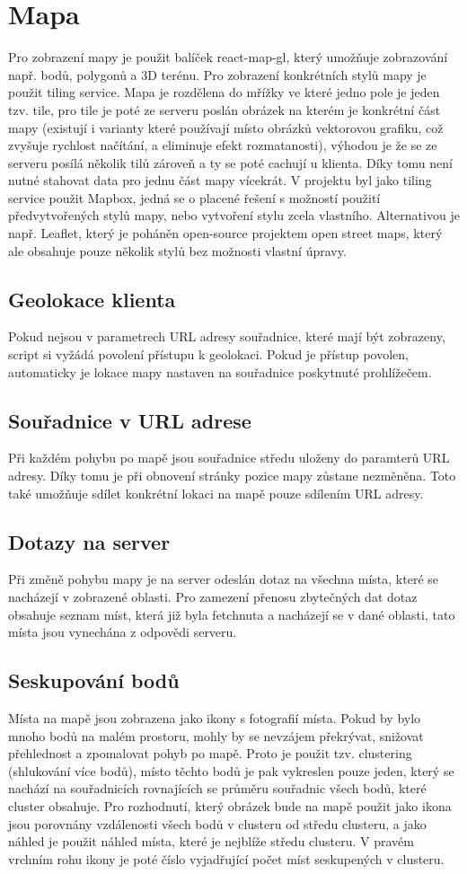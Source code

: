 \documentclass[12pt, a4paper,
 twoside,        %
 openright
]{report}
\begin{document}
\section{Mapa}
    Pro zobrazení mapy je použit balíček react-map-gl, který umožňuje zobrazování např. bodů, polygonů a 3D terénu. Pro zobrazení konkrétních stylů mapy je použit tiling service. Mapa je rozdělena do mřížky ve které jedno pole je jeden tzv. tile, pro tile je poté ze serveru poslán obrázek na kterém je konkrétní část mapy (existují i varianty které používají místo obrázků vektorovou grafiku, což zvyšuje rychlost načítání, a eliminuje efekt rozmatanosti), výhodou je že se ze serveru posílá několik tilů zároveň a ty se poté cachují u klienta. Díky tomu není nutné stahovat data pro jednu část mapy vícekrát. V projektu byl jako tiling service použit Mapbox, jedná se o placené řešení s možností použití předvytvořených stylů mapy, nebo vytvoření stylu zcela vlastního. Alternativou je např. Leaflet, který je poháněn open-source projektem open street maps, který ale obsahuje pouze několik stylů bez možnosti vlastní úpravy.
    \subsection{Geolokace klienta} Pokud nejsou v parametrech URL adresy souřadnice, které mají být zobrazeny, script si vyžádá povolení přístupu k geolokaci. Pokud je přístup povolen, automaticky je lokace mapy nastaven na souřadnice poskytnuté prohlížečem.
    \subsection{Souřadnice v URL adrese}
    Při každém pohybu po mapě jsou souřadnice středu uloženy do paramterů URL adresy. Díky tomu je při obnovení stránky pozice mapy zůstane nezměněna. Toto také umožňuje sdílet konkrétní lokaci na mapě pouze sdílením URL adresy.
    \subsection{Dotazy na server}
    Při změně pohybu mapy je na server odeslán dotaz na všechna místa, které se nacházejí v zobrazené oblasti. Pro zamezení přenosu zbytečných dat dotaz obsahuje seznam míst, která již byla fetchnuta a nacházejí se v dané oblasti, tato místa jsou vynechána z odpovědi serveru.
    \subsection{Seskupování bodů}
    Místa na mapě jsou zobrazena jako ikony s fotografií místa. Pokud by bylo mnoho bodů na malém prostoru, mohly by se nevzájem překrývat, snižovat přehlednost a zpomalovat pohyb po mapě. Proto je použit tzv. clustering (shlukování více bodů), místo těchto bodů je pak vykreslen pouze jeden, který se nachází na souřadnicích rovnajících se průměru souřadnic všech bodů, které cluster obsahuje. Pro rozhodnutí, který obrázek bude na mapě použit jako ikona jsou porovnány vzdálenosti všech bodů v clusteru od středu clusteru, a jako náhled je použit náhled místa, které je nejblíže středu clusteru. V pravém vrchním rohu ikony je poté číslo vyjadřující počet míst seskupených v clusteru.
\end{document}
